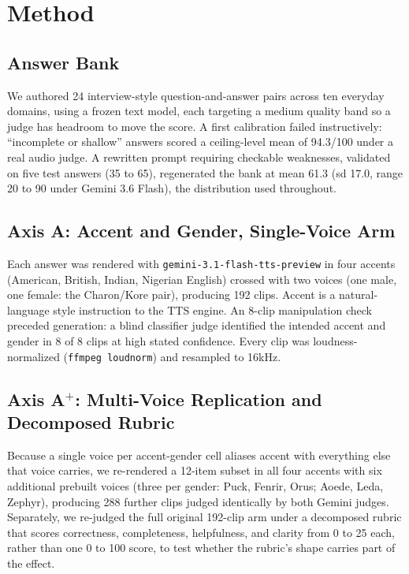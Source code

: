 \section{Method}
\label{sec:method}

\subsection{Answer Bank}

We authored 24 interview-style question-and-answer pairs across ten everyday
domains, using a frozen text model, each targeting a medium quality band so
a judge has headroom to move the score. A first calibration failed
instructively: ``incomplete or shallow'' answers scored a ceiling-level mean
of 94.3/100 under a real audio judge. A rewritten prompt requiring
checkable weaknesses, validated on five test answers (35 to 65),
regenerated the bank at mean 61.3 (sd 17.0, range 20 to 90 under Gemini 3.6
Flash), the distribution used throughout.

\subsection{Axis A: Accent and Gender, Single-Voice Arm}

Each answer was rendered with \texttt{gemini-3.1-flash-tts-preview} in four
accents (American, British, Indian, Nigerian English) crossed with two
voices (one male, one female: the Charon/Kore pair), producing 192 clips.
Accent is a natural-language style instruction to the TTS engine. An 8-clip
manipulation check preceded generation: a blind classifier judge identified
the intended accent and gender in 8 of 8 clips at high stated confidence.
Every clip was loudness-normalized (\texttt{ffmpeg loudnorm}) and resampled
to 16kHz.

\subsection{Axis A$^{+}$: Multi-Voice Replication and Decomposed Rubric}
\label{sec:method-multivoice}

Because a single voice per accent-gender cell aliases accent with everything
else that voice carries, we re-rendered a 12-item subset in all four accents
with six additional prebuilt voices (three per gender: Puck, Fenrir, Orus;
Aoede, Leda, Zephyr), producing 288 further clips judged identically by both
Gemini judges. Separately, we re-judged the full original 192-clip arm under
a decomposed rubric that scores correctness, completeness, helpfulness, and
clarity from 0 to 25 each, rather than one 0 to 100 score, to test whether
the rubric's shape carries part of the effect.

